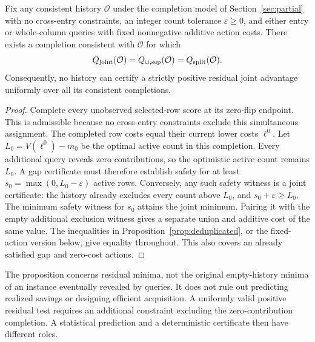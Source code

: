 \begin{proposition}
\label{prop:residual-no-uniform}
Fix any consistent history $\mathcal O$ under the completion model of Section~\ref{sec:partial} with no cross-entry constraints, an integer count tolerance $\varepsilon\ge0$, and either entry or whole-column queries with fixed nonnegative additive action costs. There exists a completion consistent with $\mathcal O$ for which
\[
 Q_{\rm joint}(\mathcal O)=Q_{\cup,\rm sep}(\mathcal O)
 =Q_{\rm split}(\mathcal O).
\]
Consequently, no history can certify a strictly positive residual joint advantage uniformly over all its consistent completions.
\end{proposition}
\begin{proof}
Complete every unobserved selected-row score at its zero-flip endpoint. This is admissible because no cross-entry constraints exclude this simultaneous assignment. The completed row costs equal their current lower costs $\ell^0$. Let $L_0=V(\ell^0)-m_0$ be the optimal active count in this completion. Every additional query reveals zero contributions, so the optimistic active count remains $L_0$. A gap certificate must therefore establish safety for at least $s_0=\max(0,L_0-\varepsilon)$ active rows. Conversely, any such safety witness is a joint certificate: the history already excludes every count above $L_0$, and $s_0+\varepsilon\ge L_0$. The minimum safety witness for $s_0$ attains the joint minimum. Pairing it with the empty additional exclusion witness gives a separate union and additive cost of the same value. The inequalities in Proposition~\ref{prop:deduplicated}, or the fixed-action version below, give equality throughout. This also covers an already satisfied gap and zero-cost actions.
\end{proof}

The proposition concerns residual minima, not the original empty-history minima of an instance eventually revealed by queries. It does not rule out predicting realized savings or designing efficient acquisition. A uniformly valid positive residual test requires an additional constraint excluding the zero-contribution completion. A statistical prediction and a deterministic certificate then have different roles.

